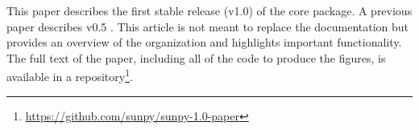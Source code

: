 This paper describes the first stable release (v1.0) of the core package.
A previous paper describes v0.5 \citep{Community:2015cy}.
This article is not meant to replace the \sunpypkg documentation but provides an overview of the organization and highlights important functionality.
The full text of the paper, including all of the code to produce the figures, is available in a \github repository\footnote{\url{https://github.com/sunpy/sunpy-1.0-paper}}.